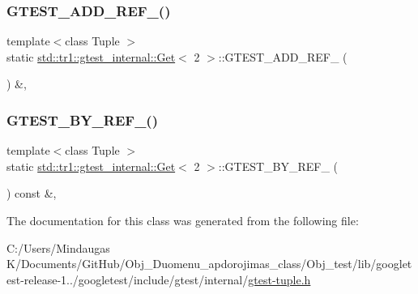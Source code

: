 \subsubsection{\texorpdfstring{GTEST\_ADD\_REF\_()}{GTEST\_ADD\_REF\_()}}
{\footnotesize\ttfamily template$<$class Tuple $>$ \\
static \mbox{\hyperlink{classstd_1_1tr1_1_1gtest__internal_1_1_get}{std\+::tr1\+::gtest\+\_\+internal\+::\+Get}}$<$ 2 $>$\+::G\+T\+E\+S\+T\+\_\+\+A\+D\+D\+\_\+\+R\+E\+F\+\_\+ (\begin{DoxyParamCaption}\item[{\mbox{\hyperlink{gtest-tuple_8h_a1b7f133d8aa02e0b7afed7b66781eeb7}{G\+T\+E\+S\+T\+\_\+\+T\+U\+P\+L\+E\+\_\+\+E\+L\+E\+M\+E\+N\+T\+\_\+}}(2, Tuple)}]{ }\end{DoxyParamCaption}) \&\hspace{0.3cm}{\ttfamily [inline]}, {\ttfamily [static]}}

\mbox{\label{classstd_1_1tr1_1_1gtest__internal_1_1_get_3_012_01_4_a76127c9c03c1f0caa61fb87d4d756b5b}} 
\subsubsection{\texorpdfstring{GTEST\_BY\_REF\_()}{GTEST\_BY\_REF\_()}}
{\footnotesize\ttfamily template$<$class Tuple $>$ \\
static \mbox{\hyperlink{classstd_1_1tr1_1_1gtest__internal_1_1_get}{std\+::tr1\+::gtest\+\_\+internal\+::\+Get}}$<$ 2 $>$\+::G\+T\+E\+S\+T\+\_\+\+B\+Y\+\_\+\+R\+E\+F\+\_\+ (\begin{DoxyParamCaption}\item[{\mbox{\hyperlink{gtest-tuple_8h_a1b7f133d8aa02e0b7afed7b66781eeb7}{G\+T\+E\+S\+T\+\_\+\+T\+U\+P\+L\+E\+\_\+\+E\+L\+E\+M\+E\+N\+T\+\_\+}}(2, Tuple)}]{ }\end{DoxyParamCaption}) const \&\hspace{0.3cm}{\ttfamily [inline]}, {\ttfamily [static]}}



The documentation for this class was generated from the following file\+:\begin{DoxyCompactItemize}
\item 
C\+:/\+Users/\+Mindaugas K/\+Documents/\+Git\+Hub/\+Obj\+\_\+\+Duomenu\+\_\+apdorojimas\+\_\+class/\+Obj\+\_\+test/lib/googletest-\/release-\/1../googletest/include/gtest/internal/\mbox{\hyperlink{gtest-tuple_8h}{gtest-\/tuple.\+h}}\end{DoxyCompactItemize}
